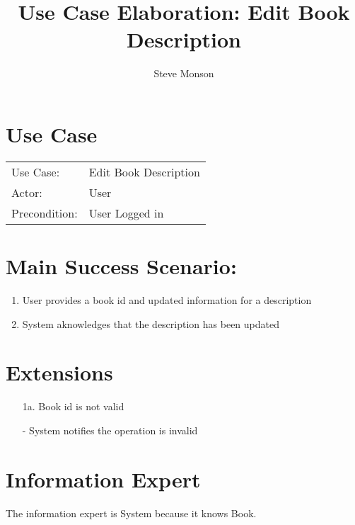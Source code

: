 \documentclass{article}
\title{Use Case Elaboration: Edit Book Description}
\author{ Steve Monson }
\begin{document}
\maketitle


\section*{Use Case}
\begin{tabular}{l l}
Use Case:     & Edit Book Description\\
Actor:        & User\\
Precondition: & User Logged in\\
\end{tabular}


\section*{Main Success Scenario:}

\begin{enumerate}
    \item User provides a book id and updated information for a description
    \item System aknowledges that the description has been updated

\end{enumerate}
 
\section*{Extensions}

\begin{itemize}
    \item [1a.] Book id is not valid
    
        - System notifies the operation is invalid
                            
\end{itemize}


\section*{Information Expert}
The information expert is System because it knows Book. 
\end{document}
